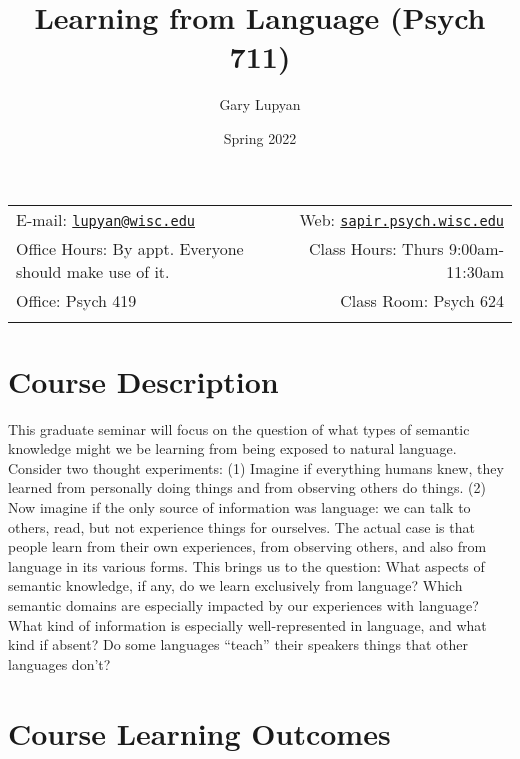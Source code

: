 \documentclass[11pt,man]{article}
\title{Learning from Language (Psych 711)}
\author{Gary Lupyan}
\date{Spring 2022}
\begin{document}
  

		\maketitle
		
	
		\thispagestyle{firststyle}



	\noindent \begin{tabular*}{\textwidth}{ @{\extracolsep{\fill}} lr @{\extracolsep{\fill}}}


E-mail: \texttt{\href{mailto:lupyan@wisc.edu}{\nolinkurl{lupyan@wisc.edu}}} & Web: \href{http://sapir.psych.wisc.edu}{\tt sapir.psych.wisc.edu}\\
Office Hours: By appt. Everyone should make use of
it.  &  Class Hours: Thurs 9:00am-11:30am\\
Office: Psych 419  & Class Room: Psych 624\\
	&  \\
	\hline
	\end{tabular*}
	
\vspace{2mm}
	


\hypertarget{course-description}{%
\section{Course Description}\label{course-description}}

This graduate seminar will focus on the question of what types of
semantic knowledge might we be learning from being exposed to natural
language. Consider two thought experiments: (1) Imagine if everything
humans knew, they learned from personally doing things and from
observing others do things. (2) Now imagine if the only source of
information was language: we can talk to others, read, but not
experience things for ourselves. The actual case is that people learn
from their own experiences, from observing others, and also from
language in its various forms. This brings us to the question: What
aspects of semantic knowledge, if any, do we learn exclusively from
language? Which semantic domains are especially impacted by our
experiences with language? What kind of information is especially
well-represented in language, and what kind if absent? Do some languages
``teach'' their speakers things that other languages don't?

\hypertarget{course-learning-outcomes}{%
\section{Course Learning Outcomes}\label{course-learning-outcomes}}
\end{document}
